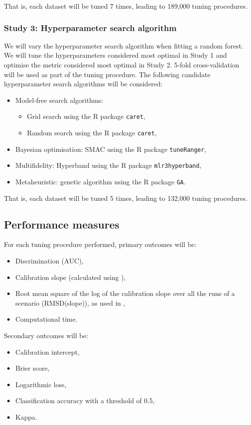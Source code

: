 \documentclass{article}
\begin{document}
That is, each dataset will be tuned 7 times, leading to 189,000 tuning procedures.

\subsubsection{Study 3: Hyperparameter search algorithm}

We will vary the hyperparameter search algorithm when fitting a random forest. We will tune the hyperparameters considered most optimal in Study 1 and optimise the metric considered most optimal in Study 2. 5-fold cross-validation will be used as part of the tuning procedure. The following candidate hyperparameter search algorithms will be considered:\begin{itemize}
    \item Model-free search algorithms:\begin{itemize}
        \item Grid search using the R package \texttt{caret},
        \item Random search using the R package \texttt{caret},
    \end{itemize}
    \item Bayesian optimisation: SMAC using the R package \texttt{tuneRanger},
    \item Multifidelity: Hyperband using the R package \texttt{mlr3hyperband},
    \item Metaheuristic: genetic algorithm using the R package \texttt{GA}.
\end{itemize}

That is, each dataset will be tuned 5 times, leading to 132,000 tuning procedures.

\subsection{Performance measures}

For each tuning procedure performed, primary outcomes will be:
\begin{itemize}
    \item Discrimination (AUC),
    \item Calibration slope (calculated using \cite{benvancalster_benvancalsterclassimb_calibration_2022}),
    \item Root mean square of the log of the calibration slope over all the runs of a scenario (RMSD(slope)), as used in \cite{van_calster_regression_2020},
    \item Computational time.
\end{itemize}
Secondary outcomes will be:
\begin{itemize}
    \item Calibration intercept,
    \item Brier score,
    \item Logarithmic loss,
    \item Classification accuracy with a threshold of 0.5,
    \item Kappa.
\end{itemize}
\end{document}
